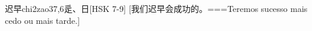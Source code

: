 \begin{EntryWithPhonetic}{迟早}{chi2zao3}{7,6}{⾡、⽇}[HSK 7-9]
  [我们迟早会成功的。===Teremos sucesso mais cedo ou mais tarde.]
\end{EntryWithPhonetic}
